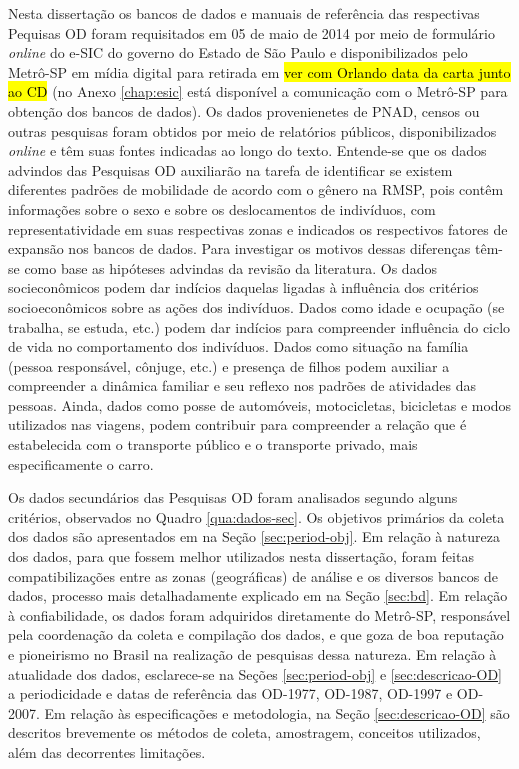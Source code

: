 Nesta dissertação os bancos de dados e manuais de referência das respectivas Pequisas OD foram requisitados em 05 de maio de 2014 por meio de formulário \emph{online} do e-SIC do governo do Estado de São Paulo e disponibilizados pelo Metrô-SP em mídia digital para retirada em \hl{ver com Orlando data da carta junto ao CD} (no Anexo \ref{chap:esic} está disponível a comunicação com o Metrô-SP para obtenção dos bancos de dados). Os dados provenienetes de PNAD, censos ou outras pesquisas foram obtidos por meio de relatórios públicos, disponibilizados \emph{online} e têm suas fontes indicadas ao longo do texto. Entende-se que os dados advindos das Pesquisas OD auxiliarão na tarefa de identificar se existem diferentes padrões de mobilidade de acordo com o gênero na RMSP, pois contêm informações sobre o sexo e sobre os deslocamentos de indivíduos, com representatividade em suas respectivas zonas e indicados os respectivos fatores de expansão nos bancos de dados. Para investigar os motivos dessas diferenças têm-se como base as hipóteses advindas da revisão da literatura. Os dados socieconômicos podem dar indícios daquelas ligadas à influência dos critérios socioeconômicos sobre as ações dos indivíduos. Dados como idade e ocupação (se trabalha, se estuda, etc.) podem dar indícios para compreender influência do ciclo de vida no comportamento dos indivíduos. Dados como situação na família (pessoa responsável, cônjuge, etc.) e presença de filhos podem auxiliar a compreender a dinâmica familiar e seu reflexo nos padrões de atividades das pessoas. Ainda, dados como posse de automóveis, motocicletas, bicicletas e modos utilizados nas viagens, podem contribuir para compreender a relação que é estabelecida com o transporte público e o transporte privado, mais especificamente o carro. 

Os dados secundários das Pesquisas OD foram analisados segundo alguns critérios, observados no Quadro \ref{qua:dados-sec}. Os objetivos primários da coleta dos dados são apresentados em na Seção \ref{sec:period-obj}. Em relação à natureza dos dados, para que fossem melhor utilizados nesta dissertação, foram feitas compatibilizações entre as zonas (geográficas) de análise e os diversos bancos de dados, processo mais detalhadamente explicado em na Seção \ref{sec:bd}. Em relação à confiabilidade, os dados foram adquiridos diretamente do Metrô-SP, responsável pela coordenação da coleta e compilação dos dados, e que goza de boa reputação e pioneirismo no Brasil na realização de pesquisas dessa natureza. Em relação à atualidade dos dados, esclarece-se na Seções \ref{sec:period-obj} e \ref{sec:descricao-OD} a periodicidade e datas de referência das OD-1977, OD-1987, OD-1997 e OD-2007. Em relação às especificações e metodologia, na Seção \ref{sec:descricao-OD} são descritos brevemente os métodos de coleta, amostragem, conceitos utilizados, além das decorrentes limitações.

